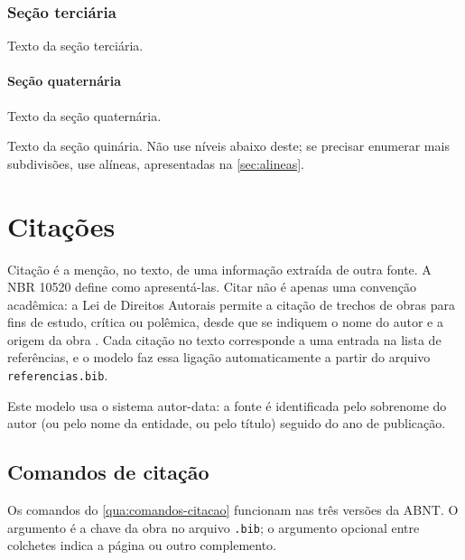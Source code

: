 \documentclass[
	12pt, %
	openright, %
	oneside, %
	a4paper, %
	sumario=tradicional, %
	english, %
	brazil, %
]{abntex2}
\begin{document}
\subsection{Seção terciária}\label{sec:terciaria}

Texto da seção terciária.

\subsubsection{Seção quaternária}\label{sec:quaternaria}

Texto da seção quaternária.

\label{sec:quinaria}

Texto da seção quinária. Não use níveis abaixo deste; se precisar enumerar mais subdivisões, use alíneas, apresentadas na \autoref{sec:alineas}.
\chapter{Citações}\label{cap:citacoes}

Citação é a menção, no texto, de uma informação extraída de outra fonte. A NBR 10520 \cite{abnt10520} define como apresentá-las. Citar não é apenas uma convenção acadêmica: a Lei de Direitos Autorais permite a citação de trechos de obras para fins de estudo, crítica ou polêmica, desde que se indiquem o nome do autor e a origem da obra \cite{brasil1998}. Cada citação no texto corresponde a uma entrada na lista de referências, e o modelo faz essa ligação automaticamente a partir do arquivo \texttt{referencias.bib}.

Este modelo usa o sistema autor-data: a fonte é identificada pelo sobrenome do autor (ou pelo nome da entidade, ou pelo título) seguido do ano de publicação.

\section{Comandos de citação}\label{sec:comandos-citacao}

Os comandos do \autoref{qua:comandos-citacao} funcionam nas três versões da ABNT. O argumento é a chave da obra no arquivo \texttt{.bib}; o argumento opcional entre colchetes indica a página ou outro complemento.
\end{document}
